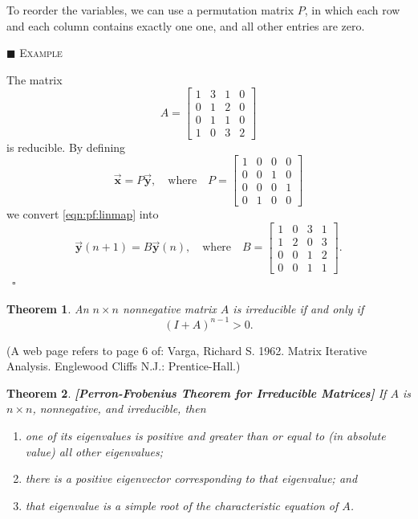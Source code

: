 \documentclass[reqno]{immbook}
\newcommand{\BX}{\vec{\textbf{x}}}
\newcommand{\BY}{\vec{\textbf{y}}}
\numberwithin{equation}{chapter}
\newtheorem{theorem}{Theorem}
\numberwithin{question}{section}
\numberwithin{theorem}{chapter}
\numberwithin{figure}{chapter}
\theoremstyle{definition}
\newenvironment{xexample}%
{%

\medskip\noindent\addtocounter{example}{1}$\blacksquare$ \textsc{Example \theexample}\hspace*{1em}%
}%
{%
~\hfill$\square$

\medskip
}
\begin{document}
To reorder the variables, we can use a permutation matrix
$P$, in which each row and each column contains exactly
one one, and all other entries are zero.
\begin{xexample}
The matrix 
\begin{equation}
  A = \begin{bmatrix}
            1 & 3 & 1 & 0 \\
            0 & 1 & 2 & 0 \\
            0 & 1 & 1 & 0 \\
            1 & 0 & 3 & 2
      \end{bmatrix}
\end{equation}
is reducible.  By defining
\begin{equation}
   \BX = P\BY, \quad \textrm{where}\quad
   P = \begin{bmatrix}
          1 & 0 & 0 & 0 \\
          0 & 0 & 1 & 0 \\
          0 & 0 & 0 & 1 \\
          0 & 1 & 0 & 0
       \end{bmatrix}
\end{equation}
we convert \eqref{eqn:pf:linmap} into
\begin{equation}
   \BY(n+1) = B\BY(n), \quad \textrm{where} \quad
   B = \begin{bmatrix}
         1 & 0 & 3 & 1 \\
         1 & 2 & 0 & 3 \\
         0 & 0 & 1 & 2 \\
         0 & 0 & 1 & 1
       \end{bmatrix}.
\end{equation}
\end{xexample}
\begin{theorem}
An $n\times n$ nonnegative matrix $A$ is 
irreducible if and only if
\begin{equation}
   (I+A)^{n-1} > 0.
\end{equation}
\end{theorem}
(A web page refers to page 6 of:
Varga, Richard S. 1962. Matrix Iterative Analysis. Englewood Cliffs N.J.: Prentice-Hall.)

\begin{theorem}
\textbf{[Perron-Frobenius Theorem for Irreducible Matrices]}
If $A$ is $n\times n$, nonnegative,
and irreducible, then
\begin{enumerate}
\item one of its eigenvalues is positive and greater
  than or equal to (in absolute value) all other
  eigenvalues;
\item there is a positive eigenvector corresponding to that eigenvalue;
  and
\item that eigenvalue is a simple root of the characteristic equation of $A$.
\end{enumerate}
\end{theorem}
\end{document}
